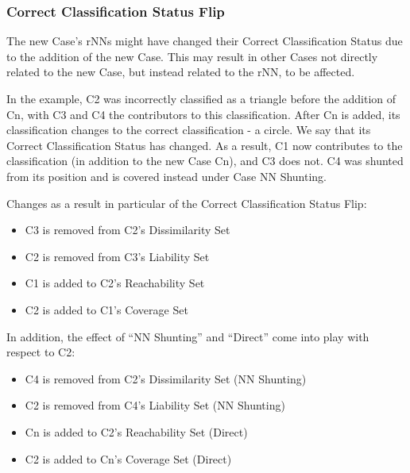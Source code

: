 \documentclass[a4paper,11pt]{report}
\begin{document}
\subsubsection{Correct Classification Status Flip}
The new Case's rNNs might have changed their Correct Classification Status due to the addition of the new Case. This may result in other Cases not directly related to the new Case, but instead related to the rNN, to be affected.

In the example, C2 was incorrectly classified as a triangle before the addition of Cn, with C3 and C4 the contributors to this classification. After Cn is added, its classification changes to the correct classification - a circle. We say that its Correct Classification Status has changed. As a result, C1 now contributes to the classification (in addition to the new Case Cn), and C3 does not. C4 was shunted from its position and is covered instead under Case NN Shunting.

Changes as a result in particular of the Correct Classification Status Flip:
\begin{itemize}
	\item C3 is removed from C2's Dissimilarity Set
	\item C2 is removed from C3's Liability Set
	\item C1 is added to C2's Reachability Set
	\item C2 is added to C1's Coverage Set
\end{itemize}

In addition, the effect of ``NN Shunting'' and ``Direct'' come into play with respect to C2:
\begin{itemize}
	\item C4 is removed from C2's Dissimilarity Set (NN Shunting)
	\item C2 is removed from C4's Liability Set (NN Shunting)
	\item Cn is added to C2's Reachability Set (Direct)
	\item C2 is added to Cn's Coverage Set (Direct)
\end{itemize}
\end{document}
